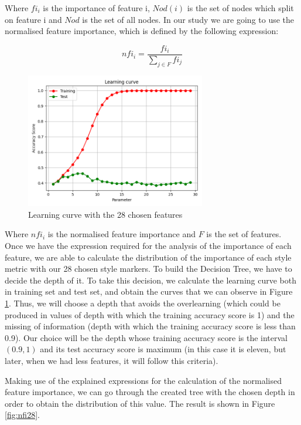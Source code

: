 Where $fi_i$ is the importance of feature i, $Nod(i)$ is the set of nodes which split on feature i and $Nod$ is the set of all nodes. In our study we are going to use the normalised feature importance, which is defined by the following expression:

$$
nfi_i=\frac{fi_i}{\sum_{j\in F}fi_j}
$$

\begin{figure}
	\centering%
	\centerline{\includegraphics[width=0.7\textwidth]{Imagenes/Bitmap/DecisionTrees/learning28curve.png}}%
	\caption{Learning curve with the 28 chosen features}%
	\label{fig:learn28curve}
\end{figure}

Where $nfi_i$ is the normalised feature importance and $F$ is the set of features. Once we have the expression required for the analysis of the importance of each feature, we are able to calculate the distribution of the importance of each style metric with our 28 chosen style markers. To build the Decision Tree, we have to decide the depth of it. To take this decision, we calculate the learning curve both in training set and test set, and obtain the curves that we can observe in Figure \ref{fig:learn28curve}. Thus, we will choose a depth that avoids the overlearning (which could be produced in values of depth with which the training accuracy score is 1) and the missing of information (depth with which the training accuracy score is less than 0.9). Our choice will be the depth whose training accuracy score is the interval $(0.9, 1)$ and its test accuracy score is maximum (in this case it is eleven, but later, when we had less features, it will follow this criteria).

Making use of the explained expressions for the calculation of the normalised feature importance, we can go through the created tree with the chosen depth in order to obtain the distribution of this value. The result is shown in Figure \ref{fig:nfi28}.

